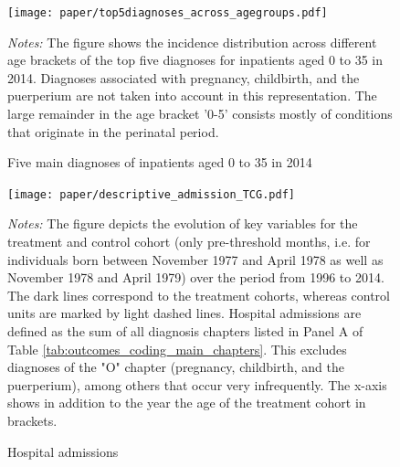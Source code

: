 \documentclass[11pt, a4paper]{article} %
\begin{document}
\vspace*{\fill}
\begin{figure}[H]\centering
	\caption{Five main diagnoses of inpatients aged 0 to 35 in 2014}\label{fig: top5diagnosis_in_2014_across_agegroups}
	\texttt{[image: paper/top5diagnoses\_across\_agegroups.pdf]}
	\begin{minipage}{\linewidth}
		\scriptsize{\emph{Notes:} The figure shows the incidence distribution across different age brackets of the top five diagnoses for inpatients aged 0 to 35 in 2014. Diagnoses associated with pregnancy, childbirth, and the puerperium are not taken into account in this representation. The large remainder in the age bracket '0-5' consists mostly of conditions that originate in the perinatal period.}
	\end{minipage}
\end{figure}
\vspace*{\fill}\clearpage
\newpage
\vspace*{\fill}
\begin{figure}[H]\centering
	\caption{Hospital admissions}\label{fig: descriptive_hospital_admission}
	\texttt{[image: paper/descriptive\_admission\_TCG.pdf]}
	\begin{minipage}{\linewidth}
		\scriptsize{\emph{Notes:} The figure depicts the evolution of key variables for the treatment and control cohort (only pre-threshold months, i.e. for individuals born between November 1977 and April 1978 as well as November 1978 and April 1979) over the period from 1996 to 2014. The dark lines correspond to the treatment cohorts, whereas control units are marked by light dashed lines. Hospital admissions are defined as the sum of all diagnosis chapters listed in Panel A of Table \ref{tab:outcomes_coding_main_chapters}. This excludes diagnoses of the "O" chapter (pregnancy, childbirth, and the puerperium), among others that occur very infrequently. The x-axis shows in addition to the year the age of the treatment cohort in brackets.} 
	\end{minipage}
\end{figure}
\vspace*{\fill}\clearpage
\end{document}
